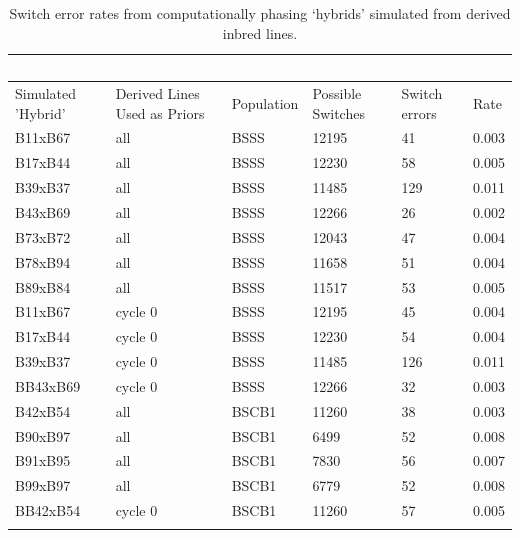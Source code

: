 \begin{table}
\caption{Switch error rates from computationally phasing ‘hybrids’ simulated from derived inbred lines.}
\begin{tabular}{ | l | l | l | l | l | l | }

\hline
	\  & \  & \  & \  & \  & \  \\ \hline
	Simulated 'Hybrid' & Derived Lines Used as Priors & Population & Possible Switches & Switch errors & Rate \\ \hline
	B11xB67 & all & BSSS & 12195 & 41 & 0.003 \\ \hline
	B17xB44 & all & BSSS & 12230 & 58 & 0.005 \\ \hline
	B39xB37 & all & BSSS & 11485 & 129 & 0.011 \\ \hline
	B43xB69 & all & BSSS & 12266 & 26 & 0.002 \\ \hline
	B73xB72 & all & BSSS & 12043 & 47 & 0.004 \\ \hline
	B78xB94 & all & BSSS & 11658 & 51 & 0.004 \\ \hline
	B89xB84 & all & BSSS & 11517 & 53 & 0.005 \\ \hline
	B11xB67 & cycle 0 & BSSS & 12195 & 45 & 0.004 \\ \hline
	B17xB44 & cycle 0 & BSSS & 12230 & 54 & 0.004 \\ \hline
	B39xB37 & cycle 0 & BSSS & 11485 & 126 & 0.011 \\ \hline
	BB43xB69 & cycle 0 & BSSS & 12266 & 32 & 0.003 \\ \hline
	B42xB54 & all & BSCB1 & 11260 & 38 & 0.003 \\ \hline
	B90xB97 & all & BSCB1 & 6499 & 52 & 0.008 \\ \hline
	B91xB95 & all & BSCB1 & 7830 & 56 & 0.007 \\ \hline
	B99xB97 & all & BSCB1 & 6779 & 52 & 0.008 \\ \hline
	BB42xB54 & cycle 0 & BSCB1 & 11260 & 57 & 0.005 \\ \hline
	    \label{tab:s3}  %
\end{tabular}
\end{table}